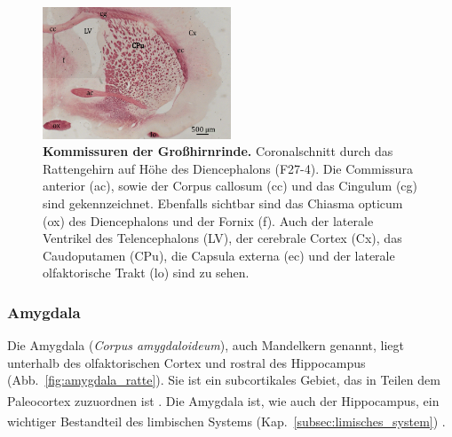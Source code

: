 \documentclass[12pt,a4paper,pdftex]{article}
\begin{document}
\begin{figure}[H]
    \centering
    \includegraphics[width=0.5\textwidth]{pictures/Bilder_Jule/Ratte/faser_cortex.png}
    \caption[Kommissuren der Großhirnrinde]{\textbf{Kommissuren der Großhirnrinde.} Coronalschnitt durch das Rattengehirn auf Höhe des Diencephalons (F27-4). Die Commissura anterior (ac), sowie der Corpus callosum (cc) und das Cingulum (cg) sind gekennzeichnet. Ebenfalls sichtbar sind das Chiasma opticum (ox) des Diencephalons und der Fornix (f). Auch der laterale Ventrikel des Telencephalons (LV), der cerebrale Cortex (Cx), das Caudoputamen (CPu), die Capsula externa (ec) und der laterale olfaktorische Trakt (lo) sind zu sehen.}
    \label{fig:faser_cortico-cortical}
\end{figure}

\subsubsection{Amygdala}
\label{subsubsec:Amygdala} 

Die Amygdala (\textit{Corpus amygdaloideum}), auch Mandelkern genannt, liegt unterhalb des olfaktorischen Cortex und rostral des Hippocampus (Abb.~\ref{fig:amygdala_ratte}). Sie ist ein subcortikales Gebiet, das in Teilen dem Paleocortex zuzuordnen ist \textsuperscript{\cite[9]{trepel2011neuroanatomie}}. Die Amygdala ist, wie auch der Hippocampus, ein wichtiger Bestandteil des limbischen Systems (Kap.~\ref{subsec:limisches_system}) \textsuperscript{\cite[15]{kandel2013principles}}.
\end{document}
